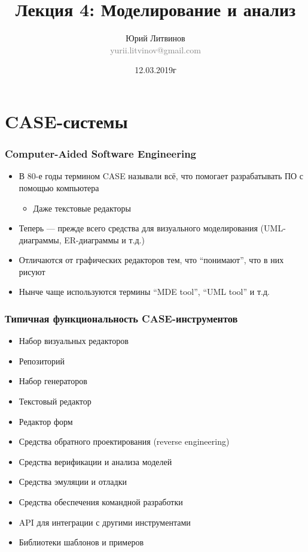 \documentclass[xetex,mathserif,serif]{beamer}
\title[Моделирование и анализ]{Лекция 4: Моделирование и анализ}
\author[Юрий Литвинов]{Юрий Литвинов\\\small{\textcolor{gray}{yurii.litvinov@gmail.com}}}
\date{12.03.2019г}
\begin{document}
	\frame{\titlepage}

	\section{CASE-системы}
	
	\begin{frame}
		\frametitle{Computer-Aided Software Engineering}
		\begin{itemize}
			\item В 80-е годы термином CASE называли всё, что помогает разрабатывать ПО с помощью компьютера
			\begin{itemize}
				\item Даже текстовые редакторы
			\end{itemize}
			\item Теперь --- прежде всего средства для визуального моделирования (UML-диаграммы, ER-диаграммы и т.д.)
			\item Отличаются от графических редакторов тем, что ``понимают'', что в них рисуют
			\item Нынче чаще используются термины ``MDE tool'', ``UML tool'' и т.д.
		\end{itemize}
	\end{frame}

	\begin{frame}
		\frametitle{Типичная функциональность CASE-инструментов}
		\begin{itemize}
			\item Набор визуальных редакторов
			\item Репозиторий
			\item Набор генераторов
			\item Текстовый редактор
			\item Редактор форм
			\item Средства обратного проектирования (reverse engineering)
			\item Средства верификации и анализа моделей
			\item Средства эмуляции и отладки
			\item Средства обеспечения командной разработки
			\item API для интеграции с другими инструментами
			\item Библиотеки шаблонов и примеров
		\end{itemize}
	\end{frame}
\end{document}
